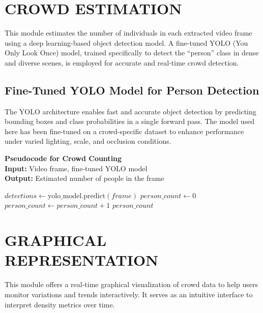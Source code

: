 \section{\MakeUppercase{Crowd Estimation}}

This module estimates the number of individuals in each extracted video frame using a deep learning-based object detection model. A fine-tuned YOLO (You Only Look Once) model, trained specifically to detect the “person” class in dense and diverse scenes, is employed for accurate and real-time crowd detection.

\subsection*{Fine-Tuned YOLO Model for Person Detection}

The YOLO architecture enables fast and accurate object detection by predicting bounding boxes and class probabilities in a single forward pass. The model used here has been fine-tuned on a crowd-specific dataset to enhance performance under varied lighting, scale, and occlusion conditions.

\noindent\textbf{Pseudocode for Crowd Counting} 
\vspace{.2em} \\
\noindent\textbf{Input:} Video frame, fine-tuned YOLO model\\
\noindent\textbf{Output:} Estimated number of people in the frame
\begin{algorithmic}[1]

    \State $detections \gets \text{yolo\_model.predict}(frame)$
    \State $person\_count \gets 0$
            \State $person\_count \gets person\_count + 1$
        \EndIf
    \EndFor
    \State \Return $person\_count$
\EndFunction
\end{algorithmic}

\section{\MakeUppercase{Graphical Representation}}

This module offers a real-time graphical visualization of crowd data to help users monitor variations and trends interactively. It serves as an intuitive interface to interpret density metrics over time.

